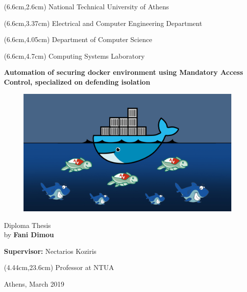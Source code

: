 \begin{mdseries}  
\begin{textblock*}{103cm}(6.6cm,2.6cm) %
\fontsize{16}{12}\selectfont 
National Technical University of Athens
\end{textblock*}
\fontsize{14}{12}\selectfont
\begin{textblock*}{103cm}(6.6cm,3.37cm)
Electrical and Computer Engineering Department
\end{textblock*}
\begin{textblock*}{103cm}(6.6cm,4.05cm)
Department of Computer Science
\end{textblock*}
\begin{textblock*}{103cm}(6.6cm,4.7cm)
Computing Systems Laboratory
\end{textblock*}

\hfill\break\hfill\break\hfill\break\hfill\break\hfill\break\hfill\break\hfill\break\hfill\break

\fontsize{18}{12}\selectfont
\begin{center}\textbf{Automation of securing docker environment using Mandatory Access Control, specialized on defending isolation}\end{center}
\hfill\break
\begin{figure}[h!]
  \centering
   \includegraphics[width=0.7\linewidth]{./figures/ekswfullo11.jpg}
\end{figure}
\hfill\break
\fontsize{17}{20.5}\selectfont

\begin{center}
Diploma Thesis
\\
by \textbf{Fani Dimou}
\end{center}

\hfill\break

\hfill\break\hfill\break
\fontsize{13}{12}\selectfont
\textbf{Supervisor:} Nectarios Koziris
\begin{textblock*}{103cm}(4.44cm,23.6cm)
Professor at NTUA
\end{textblock*}

\hfill\break\hfill\break\hfill\break
\begin{center}
Athens, March 2019
\end{center}

\end{mdseries}
\endgroup

\clearpage\null\thispagestyle{empty}
\newpage

